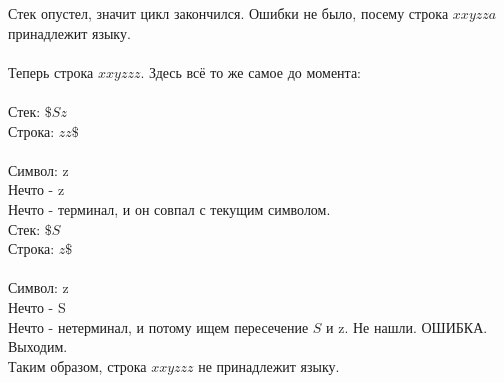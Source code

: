 \documentclass{article}
\begin{document}
Стек опустел, значит цикл закончился. Ошибки не было, посему строка $xxyzza$
принадлежит языку.\\
\\
Теперь строка $xxyzzz$. Здесь всё то же самое до момента:\\\\
Стек: $\$Sz$\\
Строка: $zz\$$\\
\\
Символ: z\\
Нечто - z\\
Нечто - терминал, и он совпал с текущим символом.\\
Стек: $\$S$\\
Строка: $z\$$\\
\\
Символ: z\\
Нечто - S\\
Нечто - нетерминал, и потому ищем пересечение $S$ и z. Не нашли. ОШИБКА.
Выходим.\\
Таким образом, строка $xxyzzz$ не принадлежит языку.
\end{document}
